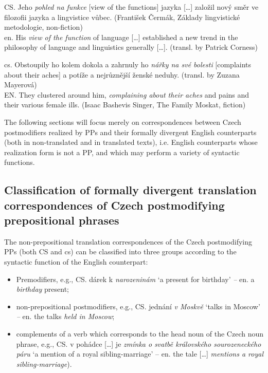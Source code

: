 \documentclass[output=paper]{langscibook}
\begin{document}
\ea\label{ex:mala:6} CS. Jeho \textit{pohled na funkce} [view of the functions] jazyka […] založil nový směr ve filozofii jazyka a lingvistice vůbec. (František Čermák, Základy lingvistické metodologie, non-fiction)\\
en. His \textit{view of the function} of language […] established a new trend in the philosophy of language and linguistics generally […]. (transl. by Patrick Corness)
\z

\ea\label{ex:mala:7}
cs. Obstoupily ho kolem dokola a zahrnuly ho \textit{nářky na své bolesti} [complaints about their aches] a potíže a nejrůznější ženské neduhy. (transl. by Zuzana Mayerová)\\
EN. They clustered around him, \textit{complaining about their aches} and pains and their various female ills.  (Isaac Bashevis Singer, The Family Moskat, fiction)
\z

The following sections will focus merely on correspondences between Czech postmodifiers realized by PPs and their formally divergent English counterparts (both in non-translated and in translated texts), i.e. English counterparts whose realization form is not a PP, and which may perform a variety of syntactic functions.

\subsection{Classification of formally divergent translation correspondences of Czech postmodifying prepositional phrases}\label{sec:mala:3.2}

The non-prepositional translation correspondences of the Czech postmodifying PPs (both CS and cs) can be classified into three groups according to the syntactic function of the English counterpart:

\begin{itemize}
\item Premodifiers, e.g., CS. dárek k \textit{narozeninám} ‘a present for birthday’ \textit{–} en. a \textit{birthday} present;
\item non-prepositional postmodifiers, e.g., CS. jednání \textit{v Moskvě}  ‘talks in Moscow’ \textit{–} en. the talks \textit{held in Moscow};
\item complements of a verb which corresponds to the head noun of the Czech noun phrase, e.g., CS. v pohádce […] je \textit{zmínka o svatbě královského sourozeneckého páru} ‘a mention of a royal sibling-marriage’ – en. the tale […] \textit{mentions a royal sibling-marriage}).
\end{itemize}
\end{document}
